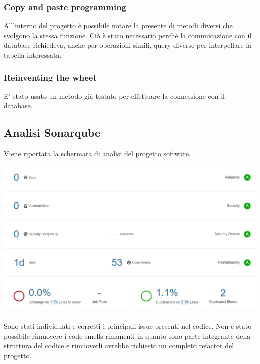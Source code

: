 \documentclass[a4paper, titlepage]{article}
\begin{document}
\subsubsection{Copy and paste programming}
All’interno del progetto è possibile notare la presente di metodi diversi che svolgono la stessa funzione. Ciò è stato necessario perchè la comunicazione con il database richiedeva, anche per operazioni simili, query diverse per interpellare la tabella interessata.
\subsubsection{Reinventing the wheet}
E' stato usato un metodo già testato per effettuare la connessione con il database.

\subsection{Analisi Sonarqube}
Viene riportata la schermata di analisi del progetto software.\\\\
\includegraphics[scale=0.60]{Immagini/Sonarqube.png}
\\\\
Sono stati individuati e corretti i principali issue presenti nel codice.
Non è stato possibile rimuovere i code smells rimanenti in quanto sono parte integrante della struttura del codice e rimuoverli avrebbe richiesto un completo refactor del progetto.
\end{document}
